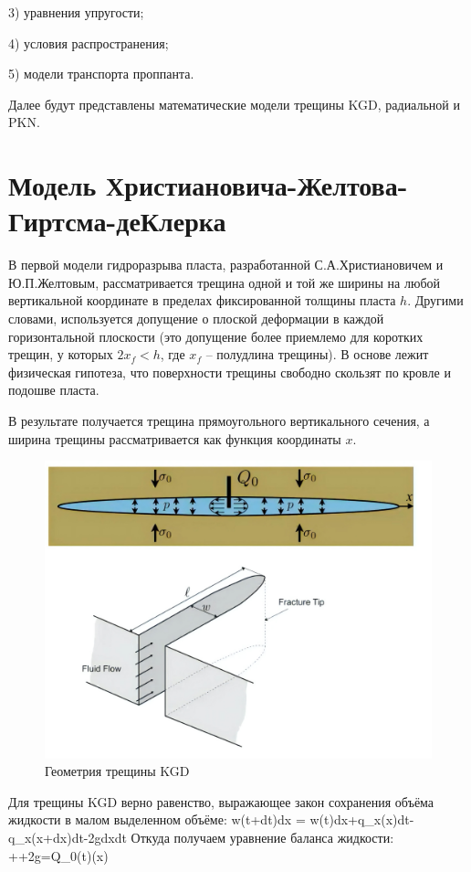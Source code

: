 3) уравнения упругости;

4) условия распространения;

5) модели транспорта проппанта.

Далее будут представлены математические модели трещины KGD, радиальной и PKN.

\section{Модель Христиановича-Желтова-Гиртсма-деКлерка}

В первой модели гидроразрыва пласта, разработанной С.А.Христиановичем и Ю.П.Желтовым, рассматривается трещина одной и той же ширины на любой вертикальной координате в пределах фиксированной толщины пласта $h$.
Другими словами, используется допущение о плоской деформации в каждой горизонтальной плоскости (это допущение более приемлемо для коротких трещин, у которых $2x_f<h$, где $x_f$ -- полудлина трещины).
В основе лежит физическая гипотеза, что поверхности трещины свободно скользят по кровле и подошве пласта.

В результате получается трещина прямоугольного вертикального сечения, а ширина трещины рассматривается как функция координаты $x$.

\begin{figure}[H] 
\center
\includegraphics[width=0.7\linewidth]{images/kgd_model_better.jpg}
\caption{Геометрия трещины KGD} 
\label{fig:kgd-model-geometry}  
\end{figure}


Для трещины KGD верно равенство, выражающее закон сохранения объёма жидкости в малом выделенном объёме:
\beq
w(t+dt)dx = w(t)dx+q_x(x)dt-q_x(x+dx)dt-2gdxdt
\eeq
Откуда получаем уравнение баланса жидкости:
\beq
{}++2g=Q_0(t)\delta(x)
\eeq

